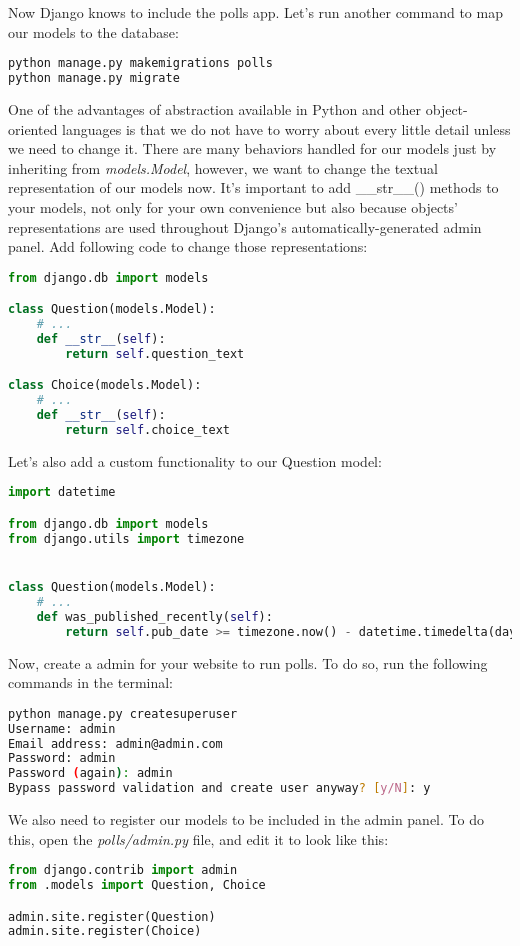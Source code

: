 \documentclass{homework}
\begin{document}
Now Django knows to include the polls app. Let’s run another command to map our models to the database:
\begin{lstlisting}[language=bash]
python manage.py makemigrations polls
python manage.py migrate
\end{lstlisting}
One of the advantages of abstraction available in Python and other object-oriented languages is that we do not have to worry about every little detail unless we need to change it. There are many behaviors handled for our models just by inheriting from \textit{models.Model}, however, we want to change the textual representation of our models now. 
It’s important to add \_\_str\_\_() methods to your models, not only for your own convenience but also because objects’ representations are used throughout Django’s automatically-generated admin panel. Add following code to change those representations:
\begin{lstlisting}[language=Python]
from django.db import models

class Question(models.Model):
    # ...
    def __str__(self):
        return self.question_text

class Choice(models.Model):
    # ...
    def __str__(self):
        return self.choice_text
\end{lstlisting}
Let's also add a custom functionality to our Question model:
\begin{lstlisting}[language=Python]
import datetime

from django.db import models
from django.utils import timezone


class Question(models.Model):
    # ...
    def was_published_recently(self):
        return self.pub_date >= timezone.now() - datetime.timedelta(days=1)
\end{lstlisting}

\newpage
Now, create a admin for your website to run polls. To do so, run the following commands in the terminal:
\begin{lstlisting}[language=bash]
python manage.py createsuperuser
Username: admin
Email address: admin@admin.com
Password: admin
Password (again): admin
Bypass password validation and create user anyway? [y/N]: y
\end{lstlisting}
We also need to register our models to be included in the admin panel. To do this, open the \textit{polls/admin.py} file, and edit it to look like this:
\begin{lstlisting}[language=Python]
from django.contrib import admin
from .models import Question, Choice

admin.site.register(Question)
admin.site.register(Choice)
\end{lstlisting}
 
\end{document}
